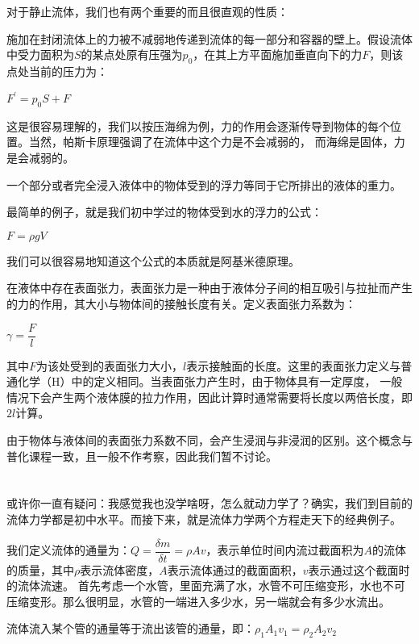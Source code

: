         对于静止流体，我们也有两个重要的而且很直观的性质：
        \begin{law}
            施加在封闭流体上的力被不减弱地传递到流体的每一部分和容器的壁上。假设流体中受力面积为$S$的某点处原有压强为$p_0$，在其上方平面施加垂直向下的力$F$，则该点处当前的压力为：
            \begin{center}
                $F^{'}=p_0 S +F$
            \end{center}
        \end{law}

        这是很容易理解的，我们以按压海绵为例，力的作用会逐渐传导到物体的每个位置。当然，帕斯卡原理强调了在流体中这个力是不会减弱的，
        而海绵是固体，力是会减弱的。
        \begin{law}
            一个部分或者完全浸入液体中的物体受到的浮力等同于它所排出的液体的重力。
        \end{law}

        最简单的例子，就是我们初中学过的物体受到水的浮力的公式：
        \begin{center}
            $F=\rho gV$
        \end{center}

        我们可以很容易地知道这个公式的本质就是阿基米德原理。

        在液体中存在表面张力，表面张力是一种由于液体分子间的相互吸引与拉扯而产生的力的作用，其大小与物体间的接触长度有关。定义表面张力系数为：
        \begin{center}
            $\gamma =\dfrac{F}{l}$
        \end{center}

        其中$F$为该处受到的表面张力大小，$l$表示接触面的长度。这里的表面张力定义与普通化学（H）中的定义相同。当表面张力产生时，由于物体具有一定厚度，
        一般情况下会产生两个液体膜的拉力作用，因此计算时通常需要将长度以两倍长度，即$2l$计算。

        由于物体与液体间的表面张力系数不同，会产生浸润与非浸润的区别。这个概念与普化课程一致，且一般不作考察，因此我们暂不讨论。
        \section[流体动力学]{}
        或许你一直有疑问：我感觉我也没学啥呀，怎么就动力学了？确实，我们到目前的流体力学都是初中水平。而接下来，就是流体力学两个方程走天下的经典例子。
        
        我们定义流体的通量为：$Q=\dfrac{\delta m}{\delta t}=\rho Av$，表示单位时间内流过截面积为$A$的流体的质量，其中$\rho$表示流体密度，$A$表示流体通过的截面面积，$v$表示通过这个截面时的流体流速。
        首先考虑一个水管，里面充满了水，水管不可压缩变形，水也不可压缩变形。那么很明显，水管的一端进入多少水，另一端就会有多少水流出。
        \begin{law}
            流体流入某个管的通量等于流出该管的通量，即：$\rho_1 A_1 v_1=\rho_2 A_2 v_2$
        \end{law}


